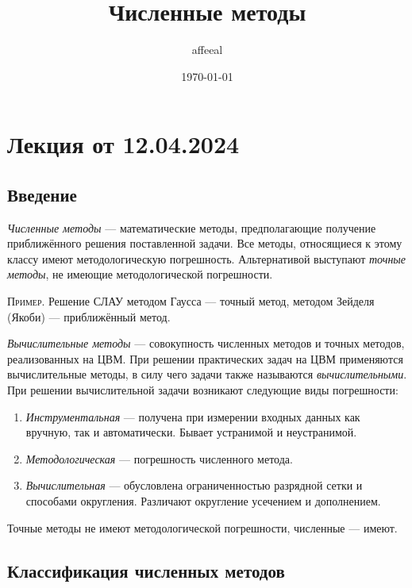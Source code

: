\documentclass{article}
\title{Численные методы}
\author{affeeal}
\date{\today}
\begin{document}
\maketitle

\pagebreak

\tableofcontents

\pagebreak

\section{Лекция от 12.04.2024}

\subsection{Введение}

\textit{Численные методы} --- математические методы, предполагающие получение
приближённого решения поставленной задачи. Все методы, относящиеся к этому
классу имеют методологическую погрешность. Альтернативой выступают
\textit{точные методы}, не имеющие методологической погрешности.

\textsc{Пример}. Решение СЛАУ методом Гаусса --- точный метод, методом Зейделя
(Якоби) --- приближённый метод.

\textit{Вычислительные методы} --- совокупность численных методов и точных
методов, реализованных на ЦВМ. При решении практических задач на ЦВМ применяются
вычислительные методы, в силу чего задачи также называются
\textit{вычислительными}. При решении вычислительной задачи возникают следующие
виды погрешности:

\begin{enumerate}
  \item \textit{Инструментальная} --- получена при измерении входных данных как
    вручную, так и автоматически. Бывает устранимой и неустранимой.

  \item \textit{Методологическая} --- погрешность численного метода.

  \item \textit{Вычислительная} --- обусловлена ограниченностью разрядной
    сетки и способами округления. Различают округление усечением и дополнением.
\end{enumerate}

Точные методы не имеют методологической погрешности, численные --- имеют.

\subsection{Классификация численных методов}
\end{document}
